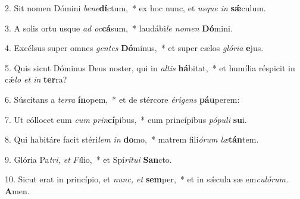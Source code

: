 \item 2. Sit nomen Dómini \textit{bene}\textbf{dí}ctum,~* ex hoc nunc, et \textit{usque in} \textbf{sǽ}culum.

\item 3. A solis ortu usque \textit{ad oc}\textbf{cá}sum,~* laudábi\hspace{0.01em}\textit{le nomen} \textbf{Dó}mini.

\item 4. Excélsus super omnes \textit{gentes} \textbf{Dó}minus,~* et super cælos \textit{glória} \textbf{e}jus.

\item 5. Quis sicut Dóminus Deus noster, qui in \textit{altis} \textbf{há}bitat,~* et humília réspicit in cǽ\textit{lo et in} \textbf{ter}ra?

\item 6. Súscitans a \textit{terra} \textbf{ín}opem,~* et de stércore \textit{érigens} \textbf{páu}perem:

\item 7. Ut cóllocet eum \textit{cum prin}\textbf{cí}pibus,~* cum princípibus \textit{pópuli} \textbf{su}i.

\item 8. Qui habitáre facit stéri\hspace{0.02em}\textit{lem in} \textbf{do}mo,~* matrem fili\textit{órum læ}\textbf{tán}tem.

\item 9. Glória Pa\hspace{0.03em}\textit{tri, et} \textit{Fí}lio,~* et Spí\textit{rítui} \textbf{San}cto.

\item 10. Sicut erat in princípio, et \textit{nunc, et}\textbf{ sem}per,~* et in sǽcula sæ em\textit{culórum.} \textbf{A}men.